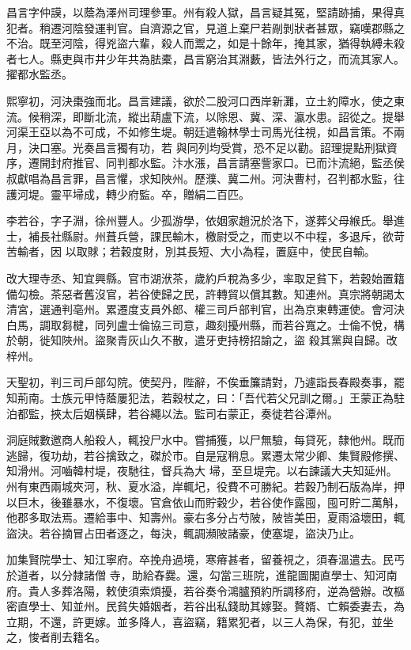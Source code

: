 \begin{pinyinscope}
 昌言字仲謨，以蔭為澤州司理參軍。州有殺人獄，昌言疑其冤，堅請跡捕，果得真犯者。稍遷河陰發運判官。自濟源之官，見道上棄尸若剮剝狀者甚眾，竊嘆郡縣之
 不治。既至河陰，得兇盜六輩，殺人而鬻之，如是十餘年，掩其家，猶得執縛未殺者七人。縣吏與市井少年共為胠橐，昌言窮治其淵藪，皆法外行之，而流其家人。擢都水監丞。



 熙寧初，河決棗強而北。昌言建議，欲於二股河口西岸新灘，立土約障水，使之東流。候稍深，即斷北流，縱出葫盧下流，以除恩、冀、深、瀛水患。詔從之。提舉河渠王亞以為不可成，不如修生堤。朝廷遣翰林學士司馬光往視，如昌言策。不兩月，決口塞。光奏昌言獨有功，若
 與同列均受賞，恐不足以勸。詔理提點刑獄資序，遷開封府推官、同判都水監。汴水漲，昌言請塞訾家口。已而汴流絕，監丞侯叔獻唱為昌言罪，昌言懼，求知陜州。歷濮、冀二州。河決曹村，召判都水監，往護河堤。靈平埽成，轉少府監。卒，贈絹二百匹。



 李若谷，字子淵，徐州豐人。少孤游學，依姻家趙況於洛下，遂葬父母緱氏。舉進士，補長社縣尉。州葺兵營，課民輸木，檄尉受之，而吏以不中程，多退斥，欲苛苦輸者，因
 以取賕；若穀度財，別其長短、大小為程，置庭中，使民自輸。



 改大理寺丞、知宜興縣。官市湖洑茶，歲約戶稅為多少，率取足貧下，若穀始置籍備勾檢。茶惡者舊沒官，若谷使歸之民，許轉貿以償其數。知連州。真宗將朝謁太清宮，選通判亳州。累遷度支員外郎、權三司戶部判官，出為京東轉運使。會河決白馬，調取芻楗，同列盧士倫協三司意，趣刻擾州縣，而若谷寬之。士倫不悅，構於朝，徙知陜州。盜聚青灰山久不散，遣牙吏持榜招諭之，盜
 殺其黨與自歸。改梓州。



 天聖初，判三司戶部勾院。使契丹，陛辭，不俟垂簾請對，乃遽詣長春殿奏事，罷知荊南。士族元甲恃蔭屢犯法，若穀杖之，曰：「吾代若父兄訓之爾。」王蒙正為駐泊都監，挾太后姻橫肆，若谷繩以法。監司右蒙正，奏徙若谷潭州。



 洞庭賊數邀商人船殺人，輒投尸水中。嘗捕獲，以尸無驗，每貸死，隸他州。既而逃歸，復功劫，若谷擒致之，磔於市。自是寇稍息。累遷太常少卿、集賢殿修撰、知滑州。河嚙韓村堤，夜馳往，督兵為大
 埽，至旦堤完。以右諫議大夫知延州。州有東西兩城夾河，秋、夏水溢，岸輒圮，役費不可勝紀。若穀乃制石版為岸，押以巨木，後雖暴水，不復壞。官倉依山而貯穀少，若谷使作露囤，囤可貯二萬斛，他郡多取法焉。遷給事中、知壽州。豪右多分占芍陂，陂皆美田，夏雨溢壞田，輒盜決。若谷摘冒占田者逐之，每決，輒調瀕陂諸豪，使塞堤，盜決乃止。



 加集賢院學士、知江寧府。卒挽舟過境，寒瘠甚者，留養視之，須春溫遣去。民丐於道者，以分隸諸僧
 寺，助給舂爨。還，勾當三班院，進龍圖閣直學士、知河南府。貴人多葬洛陽，敕使須索煩擾，若谷奏令鴻臚預約所調移府，逆為營辦。改樞密直學士、知並州。民貧失婚姻者，若谷出私錢助其嫁娶。贅婿、亡賴委妻去，為立期，不還，許更嫁。並多降人，喜盜竊，籍累犯者，以三人為保，有犯，並坐之，悛者削去籍名。




\end{pinyinscope}

